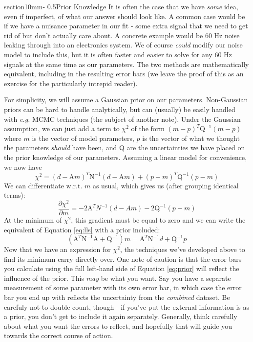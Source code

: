 \documentclass[letterpaper,11pt,preprint]{aastex}
\makeatletter
\renewcommand{\section}{\@startsection%
{section}{1}{0mm}{-\baselineskip}%
{0.5\baselineskip}{\normalfont\Large\bfseries}}%
\makeatother
\begin{document}
{\section{Prior Knowledge}
It is often the case that we have \textit{some} idea, even if
imperfect, of what our answer should look like.  A common case would
be if we have a nuisance parameter in our fit - some extra signal that
we need to get rid of but don't actually care about.  A concrete
example would be 60 Hz noise leaking through into an electronics
system.  We of course \textit{could} modify our noise model to include
this, but it is often faster and easier to solve for any 60 Hz signals
at the same time as our parameters.  The two methods are
mathematically equivalent, including in the resulting error bars (we leave the proof of this as an exercise
for the particularly intrepid reader). 

For simplicity, we will assume a Gaussian prior on our parameters.
Non-Gaussian priors can be hard to handle analytically, but can
(usually) be easily handled with \textit{e.g.} MCMC techniques (the
subject of another note).  Under
the Gaussian assumption, we can just add a term to $\chi^2$ of the
form $(m-p)^T\mathrm{Q}^{-1}(m-p)$ where $m$ is the vector of model
parameters, $p$ is the vector of what we thought the parameters
\textit{should} have been, and $\mathrm{Q}$ are the uncertainties we
have placed on the prior knowledge of our parameters.  Assuming a
linear model for convenience, we now have
$$\chi^2 = (d-\mathrm{A}m)^T\mathrm{N}^{-1}(d-\mathrm{A}m)+(p-m)^T\mathrm{Q}^{-1}(p-m)$$
We can differentiate w.r.t. $m$ as usual, which gives us (after
grouping identical terms):
$$\frac{\partial \chi^2}{\partial m}=-2\mathrm{A}^TN^{-1}(d-Am) -2\mathrm{Q}^{-1}(p-m)$$
At the minimum of $\chi^2$, this gradient must be equal to zero and we
can write the equivalent of Equation \ref{eq:lls} with a prior
included:
\begin{equation}\label{eq:prior}\left ( \mathrm{A}^T \mathrm{N}^{-1} \mathrm{A} + \mathrm{Q}^{-1}
\right )m = \mathrm{A}^T\mathrm{N}^{-1}d +
\mathrm{Q}^{-1}p\end{equation}
Now that we have an expression for $\chi^2$, the techniques we've
developed above to find its minimum carry directly over.  One note of
caution is that the error bars you calculate using the full left-hand
side of Equation \ref{eq:prior} will reflect the influence of the
prior.  This \textit{may} be what you want.  Say you have a separate
measurement of some parameter with its own error bar, in which case
the error bar you end up with reflects the uncertainty from the
\textit{combined} dataset.  Be carefuly not to double-count, though -
if you've put the external information is as a prior, you don't get to
include it again separately.  Generally, think carefully about what
you want the errors to reflect, and hopefully that will guide you
towards the correct course of action.

}
\end{document}
